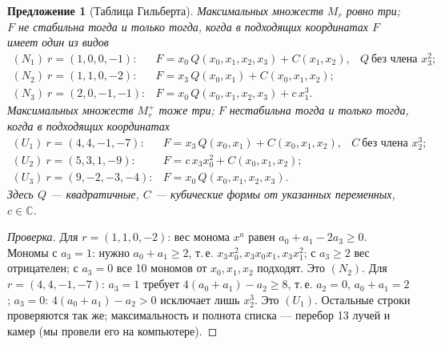 \documentclass[11pt,a4paper]{article}
\theoremstyle{plain}
\newtheorem{proposition}[theorem]{Предложение}
\theoremstyle{definition}
\theoremstyle{remark}
\renewcommand{\C}{\mathbb{C}}
\begin{document}
\begin{proposition}[Таблица Гильберта]\label{prop:Hilbert-table}
Максимальных множеств $M_r$ ровно три; $F$ не стабильна тогда и только тогда, когда в подходящих
координатах $F$ имеет один из видов
\[
\begin{array}{lll}
(N_1)\ r=(1,0,0,-1): & F=x_0\,Q(x_0,x_1,x_2,x_3)+C(x_1,x_2), & Q\ \text{без члена } x_3^2;\\
(N_2)\ r=(1,1,0,-2): & F=x_3\,Q(x_0,x_1)+C(x_0,x_1,x_2); &\\
(N_3)\ r=(2,0,-1,-1): & F=x_0\,Q(x_0,x_1,x_2,x_3)+c\,x_1^3. &
\end{array}
\]
Максимальных множеств $M_r^+$ тоже три; $F$ нестабильна тогда и только тогда, когда в подходящих
координатах
\[
\begin{array}{lll}
(U_1)\ r=(4,4,-1,-7): & F=x_3\,Q(x_0,x_1)+C(x_0,x_1,x_2), & C\ \text{без члена } x_2^3;\\
(U_2)\ r=(5,3,1,-9): & F=c\,x_3x_0^2+C(x_0,x_1,x_2); &\\
(U_3)\ r=(9,-2,-3,-4): & F=x_0\,Q(x_0,x_1,x_2,x_3). &
\end{array}
\]
Здесь $Q$ --- квадратичные, $C$ --- кубические формы от указанных переменных, $c\in\C$.
\end{proposition}

\begin{proof}[Проверка]
Для $r=(1,1,0,-2)$: вес монома $x^a$ равен $a_0+a_1-2a_3\ge0$. Мономы с $a_3=1$: нужно
$a_0+a_1\ge2$, т.\,е. $x_3x_0^2,x_3x_0x_1,x_3x_1^2$; с $a_3\ge2$ вес отрицателен; с $a_3=0$ все 10
мономов от $x_0,x_1,x_2$ подходят. Это $(N_2)$. Для $r=(4,4,-1,-7)$: $a_3=1$ требует
$4(a_0+a_1)-a_2\ge8$, т.\,е. $a_2=0$, $a_0+a_1=2$; $a_3=0$: $4(a_0+a_1)-a_2>0$ исключает лишь
$x_2^3$. Это $(U_1)$. Остальные строки проверяются так же; максимальность и полнота списка --- перебор
13 лучей и камер (мы провели его на компьютере).
\end{proof}
\end{document}
